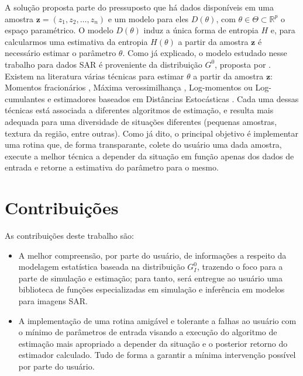 A solução proposta parte do pressuposto que há dados disponíveis em uma amostra $\bm z = (z_1, z_2, \dots, z_n)$ e um modelo para eles $D(\theta)$, com $\theta \in \Theta \subset \mathbb{R}^{p}$ o espaço paramétrico. 
O modelo $D(\theta)$ induz a única forma de entropia $H$ e, para calcularmos uma estimativa da entropia $H(\theta)$ a partir da amostra $\bm z$ é necessário estimar o parâmetro $\theta$. 
Como já explicado, o modelo estudado nesse trabalho para dados SAR é proveniente da distribuição $G^0$, proposta por \citet{Clutter1997}. 
Existem na literatura várias técnicas para estimar $\theta$ a partir da amostra $\bm z$: 
Momentos fracionários \citep{Mejail2002}, 
Máxima verossimilhança \citep{FreryMinute2004}, 
Log-momentos ou Log-cumulantes \citep{krylov2013,nicolas2002} e 
estimadores baseados em Distâncias Estocásticas \citep{Cassetti2013,FreryStochasticDistances2015}. 
Cada uma dessas técnicas está associada a diferentes algoritmos de estimação, e resulta mais adequada para uma diversidade de situações diferentes (pequenas amostras, textura da região, entre outras). 
Como já dito, o principal objetivo é implementar uma rotina que, de forma transparante, colete do usuário uma dada amostra, execute a melhor técnica a depender da situação em função apenas dos dados de entrada e retorne a estimativa do parâmetro para o mesmo.


\section{Contribuições}

As contribuições deste trabalho são:

\begin{itemize}
\item A melhor compreensão, por parte do usuário, de informações a respeito da modelagem estatística baseada na distribuição $G_I^0$, trazendo o foco para a parte de simulação e estimação; para tanto, será entregue ao usuário uma biblioteca de funções especializadas em simulação e inferência em modelos para imagens SAR. 
\item A implementação de uma rotina amigável e tolerante a falhas ao usuário com o mínimo de parâmetros de entrada visando a execução do algoritmo de estimação mais apropriado a depender da situação e o posterior retorno do estimador calculado. 
Tudo de forma a garantir a mínima intervenção possível por parte do usuário.
\end{itemize}

